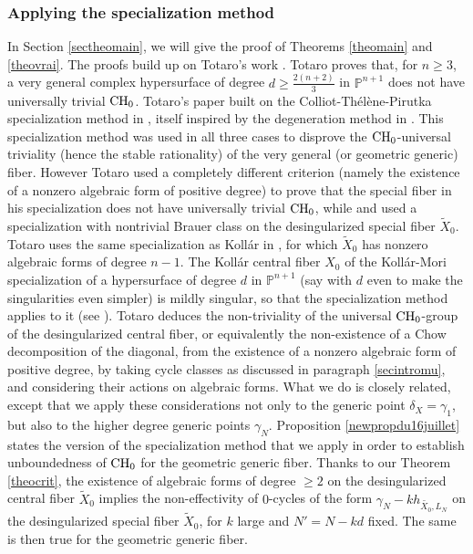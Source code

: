 \documentclass[10pt]{article}
\begin{document}
\subsubsection{Applying the specialization method \label{secintrospecmeth}}
In Section \ref{sectheomain}, we will give the proof of Theorems \ref{theomain} and \ref{theovrai}.  The proofs build up   on   Totaro's work  \cite{totaro}.
 Totaro  proves that, for $n\geq3$, a very general complex hypersurface of degree $d\geq \frac{2(n+2)}{3}$ in  $\mathbb{P}^{n+1}$ does not have universally trivial ${\rm CH}_0$.
 Totaro's paper built on  the Colliot-Th\'{e}l\`{e}ne-Pirutka specialization method in  \cite{CTPi},  itself inspired by  the degeneration method in \cite{voisininvent}. This specialization method was used in all three cases  to disprove the ${\rm CH}_0$-universal triviality (hence the stable rationality) of the very general (or geometric generic) fiber. However Totaro used a completely different criterion (namely the existence of a nonzero algebraic form of positive degree) to prove that the special fiber in his specialization does not have  universally trivial ${\rm CH}_0$, while \cite{voisininvent} and \cite{CTPi} used a specialization with nontrivial Brauer class on the desingularized special fiber $\widetilde{X}_0$. Totaro uses the same  specialization as Koll\'ar in  \cite{kollar}, for  which  $\widetilde{X}_0$   has nonzero algebraic forms of degree $n-1$.
 The Koll\'ar central fiber $X_0$ of the Koll\'ar-Mori specialization of a hypersurface of degree $d$ in $\mathbb{P}^{n+1}$ (say with $d$ even to make the singularities even simpler)  is mildly singular, so that the specialization method applies to it (see \cite{totaro}). Totaro deduces the non-triviality of the universal ${\rm CH}_0$-group of the desingularized central fiber, or equivalently the non-existence of a Chow decomposition of the diagonal, from the existence of a nonzero algebraic form of positive degree, by taking cycle classes as discussed in paragraph \ref{secintromu}, and considering their actions on algebraic forms. What we do is  closely related, except that we apply these considerations not only  to the generic point $\delta_X=\gamma_1$, but also to the higher degree generic points $\gamma_N$. Proposition \ref{newpropdu16juillet} states  the version of the specialization method that  we  apply in order to establish unboundedness of ${\rm CH}_0$ for the geometric generic fiber.
Thanks to our Theorem \ref{theocrit}, the existence of algebraic  forms of degree $\geq 2$ on the desingularized central fiber $\widetilde{X}_0$  implies   the non-effectivity of $0$-cycles of the form $\gamma_{N}-k h_{\widetilde{X_0},L_{N}}$  on  the desingularized special fiber $\widetilde{X}_0$, for $k$ large and $N'=N-kd$ fixed. The same is  then true for the geometric generic fiber.
\end{document}
